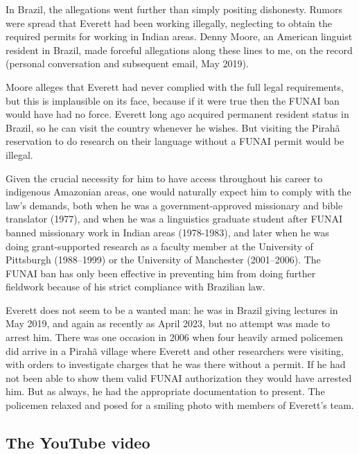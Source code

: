 \documentclass[output=paper,colorlinks,citecolor=brown
]{langscibook}
\begin{document}
In Brazil, the allegations went further than simply positing
dishonesty. Rumors were spread that Everett had been working
illegally, neglecting to obtain the required permits for working in
Indian areas. Denny Moore, an American linguist resident in Brazil,
made forceful allegations along these lines to me, on the record
(personal conversation and subsequent email, May 2019).

Moore alleges that Everett had never complied with the full legal
requirements, but this is implausible on its face, because if it were
true then the FUNAI ban would have had no force. Everett long ago
acquired permanent resident status in Brazil, so he can visit the
country whenever he wishes. But visiting the Pirah{\~a} reservation
to do research on their language without a FUNAI permit would be
illegal.

Given the crucial necessity for him to have access throughout his
career to indigenous Amazonian areas, one would naturally expect him
to comply with the law's demands, both when he was a government-approved
missionary and bible translator (1977), and when he was a linguistics
graduate student after FUNAI banned missionary work in Indian areas
(1978-1983), and later when he was doing grant-supported research as
a faculty member at the University of Pittsburgh (1988--1999) or the
University of Manchester (2001--2006). The FUNAI ban has only been
effective in preventing him from doing further fieldwork because of
his strict compliance with Brazilian law.

Everett does not seem to be a wanted man: he was in Brazil giving
lectures in May 2019, and again as recently as April 2023, but no
attempt was made to arrest him. There was one occasion in 2006 when
four heavily armed policemen did arrive in a Pirah{\~a} village
where Everett and other researchers were visiting, with orders to
investigate charges that he was there without a permit. If he had
not been able to show them valid FUNAI authorization they would
have arrested him. But as always, he had the appropriate documentation
to present. The policemen relaxed and posed for a smiling photo with
members of Everett's team.

\subsection{The YouTube video}
\end{document}
